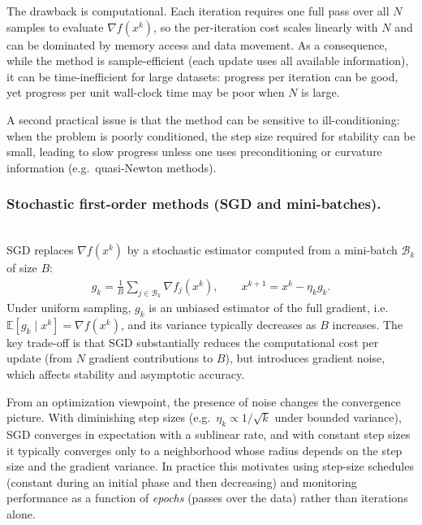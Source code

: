 The drawback is computational. Each iteration requires one full pass over all $N$ samples to evaluate $\nabla f(x^k)$, so the per-iteration cost scales linearly with $N$ and can be dominated by memory access and data movement.\cite{Boyd2009}
As a consequence, while the method is sample-efficient (each update uses all available information), it can be time-inefficient for large datasets: progress per iteration can be good, yet progress per unit wall-clock time may be poor when $N$ is large.

A second practical issue is that the method can be sensitive to ill-conditioning: when the problem is poorly conditioned, the step size required for stability can be small, leading to slow progress unless one uses preconditioning or curvature information (e.g.\ quasi-Newton methods).

\medskip
\subsubsection{Stochastic first-order methods (SGD and mini-batches).}\;\\
SGD replaces $\nabla f(x^k)$ by a stochastic estimator computed from a mini-batch $\mathcal{B}_k$ of size $B$:
\begin{align}
\label{eq:minibatch}
g_k=\frac{1}{B}\sum_{j\in\mathcal{B}_k}\nabla f_j(x^k),
\qquad
x^{k+1}=x^k-\eta_k g_k.
\end{align}
Under uniform sampling, $g_k$ is an unbiased estimator of the full gradient, i.e.\ $\mathbb{E}[g_k\mid x^k]=\nabla f(x^k)$, and its variance typically decreases as $B$ increases.\cite{Bottou2012,Bubeck2015}
The key trade-off is that SGD substantially reduces the computational cost per update (from $N$ gradient contributions to $B$), but introduces gradient noise, which affects stability and asymptotic accuracy.

From an optimization viewpoint, the presence of noise changes the convergence picture. With diminishing step sizes (e.g.\ $\eta_k\propto 1/\sqrt{k}$ under bounded variance), SGD converges in expectation with a sublinear rate, and with constant step sizes it typically converges only to a neighborhood whose radius depends on the step size and the gradient variance.\cite{Bubeck2015,Bottou2012}
In practice this motivates using step-size schedules (constant during an initial phase and then decreasing) and monitoring performance as a function of \emph{epochs} (passes over the data) rather than iterations alone.\cite{Bottou2012}

